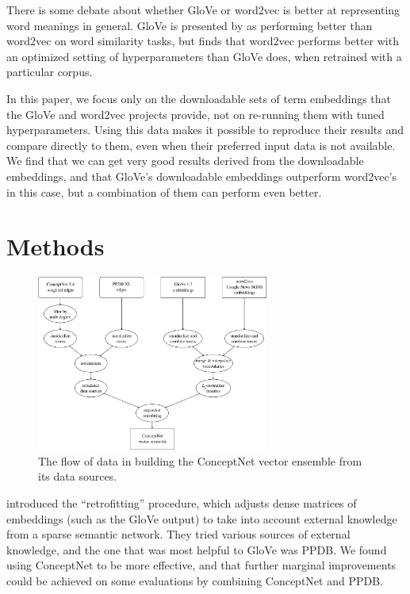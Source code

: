 \documentclass[11pt,letterpaper]{article}
\begin{document}
There is some debate about whether GloVe or word2vec is better at representing
word meanings in general. GloVe is presented by 
as performing better than word2vec on word similarity tasks, but
 finds that word2vec performs better with an
optimized setting of hyperparameters than GloVe does, when retrained with a
particular corpus.

In this paper, we focus only on the downloadable sets of term embeddings that
the GloVe and word2vec projects provide, not on re-running them with tuned
hyperparameters. Using this data makes it possible to reproduce their results
and compare directly to them, even when their preferred input data is not
available. We find that we can get very good results derived from
the downloadable embeddings, and that GloVe's downloadable embeddings outperform
word2vec's in this case, but a combination of them can perform even better.

\section{Methods}

\begin{figure}
\centering
\includegraphics[width=3.0in]{dataflow.pdf}
\caption{
    The flow of data in building the ConceptNet vector ensemble from its
    data sources.
}
\label{dataflow}
\end{figure}

 introduced the ``retrofitting'' procedure,
which adjusts dense matrices of embeddings (such as the GloVe output) to take
into account external knowledge from a sparse semantic network. They tried
various sources of external knowledge, and the one that was most helpful to
GloVe was PPDB.  We found using ConceptNet to be more effective, and that
further marginal improvements could be achieved on some evaluations by
combining ConceptNet and PPDB.
\end{document}
